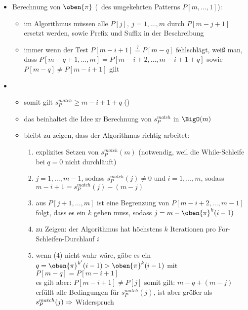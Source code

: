 \begin{itemize}[itemsep=-2pt]
\begin{enumerate}
				
		\end{enumerate}
	\item Berechnung von $\oben{\pi}$ (\bound~des umgekehrten Patterns $P[m,\dots,1]$):
		\begin{itemize}[itemsep=-2pt]
			\item im Algorithmus müssen alle $P[j],~j=1,\dots,m$ durch $P[m-j+1]$ ersetzt werden, sowie Prefix und Suffix in der Beschreibung
			\item immer wenn der Test $P[m-i+1]\overset{?}{=}P[m-q]$ fehlschlägt, weiß man, dass $P[m-q+1,\dots,m]=P[m-i+2,\dots,m-i+1+q]$ sowie $P[m-q]\neq P[m-i+1]$ gilt\\\up
			
		\end{itemize}
\end{itemize}
\topbreak
\up\up
\begin{itemize}
	\item[]
		\begin{itemize}
			\item somit gilt $s_P^{match}\geq m-i+1+q$ ()%
			\item das beinhaltet die Idee zr Berechnung von $s_P^{match}$ in $\BigO(m)$
			\item bleibt zu zeigen, dass der Algorithmus richtig arbeitet:
				\begin{enumerate}
					\item explizites Setzen von $s_P^{match}(m)$ (notwendig, weil die While-Schleife bei $q=0$ nicht durchläuft)
					\item $j=1,\dots,m-1$, sodass $s_P^{match}(j)\neq 0$ und $i=1,\dots,m$, sodass $m-i+1=s_P^{match}(j)-(m-j)$\\\up
						
					\item aus $P[j+1,\dots,m]$ ist eine Begrenzung von $P[m-i+2,\dots,m-1]$ folgt, dass es ein $k$ geben muss, sodass $j=m-\oben{\pi}^k(i-1)$
					\item zu Zeigen: der Algorithmus hat höchstens $k$ Iterationen pro For-Schleifen-Durchlauf $i$
					\item wenn (4) nicht wahr wäre, gäbe es ein $q=\oben{\pi}^{k'}(i-1) > \oben{\pi}^k(i-1)$ mit $P[m-q]=P[m-i+1]$\\
					es gilt aber: $P[m-i+1]\neq P[j]$ somit gilt: $m-q+(m-j)$ erfüllt alle Bedingungen für $s_P^{match}(j)$, ist aber größer als $s_P^{match}(j)\\
					\Rightarrow$ Widerspruch
				\end{enumerate}
		\end{itemize}
\end{itemize}